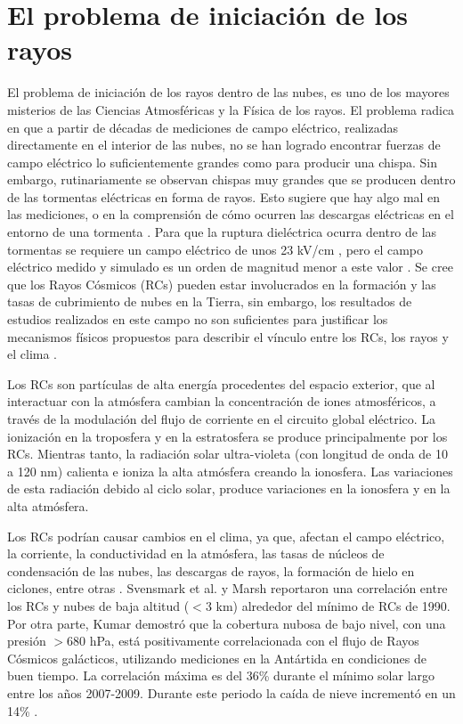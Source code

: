 \documentclass[12pt,oneside,openany,letter]{book}
\begin{document}
\section{El problema de iniciación de los rayos}
El problema de iniciación de los rayos dentro de las nubes, es uno de los mayores misterios de las Ciencias Atmosféricas y la Física de los rayos. El problema radica en que a partir de décadas de mediciones de campo eléctrico, realizadas directamente en el interior de las nubes, no se han logrado encontrar fuerzas de campo eléctrico lo suficientemente grandes como para producir una chispa. Sin embargo, rutinariamente se observan chispas muy grandes que se producen dentro de las tormentas eléctricas en forma de rayos. Esto sugiere que hay algo mal en las mediciones, o en la comprensión de cómo ocurren las descargas eléctricas en el entorno de una tormenta \cite{DwyerUman2014}. Para que la ruptura dieléctrica ocurra dentro de las tormentas se requiere un campo eléctrico de unos 23 kV/cm \cite{GurevichEtal2009}, pero el campo eléctrico medido y simulado es un orden de magnitud menor a este valor \cite{MarshallEtal2005, DwyerEtal2006, StolzenburgEtal2007}. Se cree que los Rayos Cósmicos (RCs) pueden estar involucrados en la formación y las tasas de cubrimiento de nubes en la Tierra, sin embargo, los resultados de estudios realizados en este campo no son suficientes para justificar los mecanismos físicos propuestos para describir el vínculo entre los RCs, los rayos y el clima \cite{KumarEtal2018}.

Los RCs son partículas de alta energía procedentes del espacio exterior, que al interactuar con la atmósfera cambian la concentración de iones atmosféricos, a través de la modulación del flujo de corriente en el circuito global eléctrico. La ionización en la troposfera y en la estratosfera se produce principalmente por los RCs. Mientras tanto, la radiación solar ultra-violeta (con longitud de onda de 10 a 120 nm) calienta e ioniza la alta atmósfera creando la ionosfera. Las variaciones de esta radiación debido al ciclo solar, produce variaciones en la ionosfera y en la alta atmósfera.   

Los RCs podrían causar cambios en el clima, ya que, afectan el campo el\'ectrico, la corriente, la conductividad en la atmósfera, las tasas de núcleos de condensación de las nubes, las descargas de rayos, la formaci\'on de hielo en ciclones, entre otras \cite{KumarEtal2018}. Svensmark et al. \cite{SvensmarkETal1997} y Marsh \cite{MarshSvensmark2000} reportaron una correlación entre los RCs y nubes de baja altitud ($<3$ km) alrededor del mínimo de RCs de 1990. Por otra parte, Kumar \cite{Kumar2017} demostró que la cobertura nubosa de bajo nivel, con una presión $> 680$ hPa, está positivamente correlacionada con el flujo de Rayos Cósmicos galácticos, utilizando mediciones en la Antártida en condiciones de buen tiempo. La correlación máxima es del 36\% durante el mínimo solar largo entre los años 2007-2009. Durante este periodo la ca\'ida de nieve increment\'o en un 14\% \cite{KumarEtal2018}. 
\end{document}
